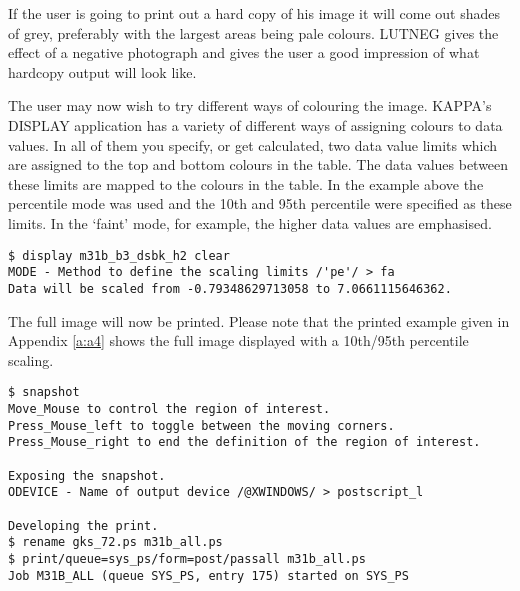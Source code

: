 \documentclass[twoside,11pt]{article}
\begin{document}
If the user is going to print out a hard copy of his image it will come out
shades of grey, preferably with the largest areas being pale colours. LUTNEG
gives the effect of a negative photograph and gives the user a good impression
of what hardcopy output will look like.

The user may now wish to try different ways of colouring the image. KAPPA's
DISPLAY application has a variety of different ways of assigning colours to
data values. In all of them you specify, or get calculated, two data value
limits which are assigned to the top and bottom colours in the table. The data 
values between these limits are mapped to the colours in the table. In the
example above the  percentile mode was used and the 10th and
95th percentile were specified as these limits. In the `faint' mode, for
example, the higher data values are emphasised.

\begin{small}
\begin{verbatim}
$ display m31b_b3_dsbk_h2 clear
MODE - Method to define the scaling limits /'pe'/ > fa
Data will be scaled from -0.79348629713058 to 7.0661115646362.
\end{verbatim}
\end{small}

The full image will now be printed. Please note that the printed example given
in Appendix \ref{a:a4} shows the full image displayed with a 10th/95th
percentile scaling.

\begin{small}
\begin{verbatim}
$ snapshot
Move_Mouse to control the region of interest.
Press_Mouse_left to toggle between the moving corners.
Press_Mouse_right to end the definition of the region of interest.

Exposing the snapshot.
ODEVICE - Name of output device /@XWINDOWS/ > postscript_l

Developing the print.
$ rename gks_72.ps m31b_all.ps
$ print/queue=sys_ps/form=post/passall m31b_all.ps
Job M31B_ALL (queue SYS_PS, entry 175) started on SYS_PS
\end{verbatim}
\end{small}
\end{document}
